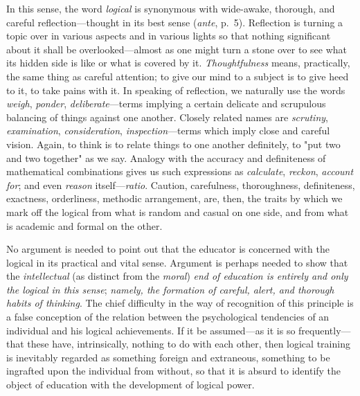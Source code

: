 \documentclass[showtrims,ustradepaper]{memoir}
\begin{document}
In this sense, the word \emph{logical} is synonymous with wide-awake,
thorough, and careful reflection---thought in its best sense
(\emph{ante}, p.\ 5). Reflection is turning a topic over in various
aspects and in various lights so that nothing significant about it shall
be overlooked---almost as one might turn a stone over to see what its
hidden side is like or what is covered by it. \emph{Thoughtfulness}
means, practically, the same thing as careful attention; to give our
mind to a subject is to give heed to it, to take pains with it. In
speaking of reflection, we naturally use the words \emph{weigh},
\emph{ponder}, \emph{deliberate}---terms implying a certain delicate and
scrupulous balancing of things against one another. Closely related
names are \emph{scrutiny}, \emph{examination}, \emph{consideration},
\emph{inspection}---terms which imply close and careful vision. Again,
to think is to relate things to one another definitely, to "put two and
two together" as we say. Analogy with the accuracy and definiteness of
mathematical combinations gives us such expressions as \emph{calculate},
\emph{reckon}, \emph{account for}; and even \emph{reason}
itself---\emph{ratio}. Caution, carefulness, thoroughness, definiteness,
exactness, orderliness, methodic arrangement, are, then, the traits by
which we mark off the logical from what is random and casual on one
side, and from what is academic and formal on the other.



No argument is needed to point out that the educator is concerned with
the logical in its practical and vital sense. Argument is perhaps needed
to show that the \emph{intellectual} (as distinct from the \emph{moral})
\emph{end of education is entirely and only the logical in this sense};
\emph{namely,
the formation of careful, alert, and thorough habits of thinking}. The
chief difficulty in the way of recognition of this principle is a false
conception of the relation between the psychological tendencies of an
individual and his logical achievements. If it be assumed---as it is so
frequently---that these have, intrinsically, nothing to do with each
other, then logical training is inevitably regarded as something foreign
and extraneous, something to be ingrafted upon the individual from
without, so that it is absurd to identify the object of education with
the development of logical power.
\end{document}
